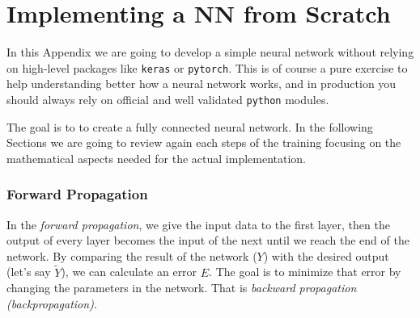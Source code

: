 \chapter{Implementing a NN from Scratch}
\label{sec:nn_from_scratch}

In this Appendix we are going to develop a simple neural network without relying on high-level packages like \texttt{keras} or \texttt{pytorch}.
This is of course a pure exercise to help understanding better how a neural network works, and in production you should always rely on official and well validated \texttt{python} modules.

%

The goal is to to create a fully connected neural network. In the following Sections we are going to review again each steps of the training focusing on the mathematical aspects needed for the actual implementation.

\subsection{Forward Propagation}
In the \emph{forward propagation}, we give the input data to the first layer, then the output of every layer becomes the input of the next until we reach the end of the network. By comparing the result of the network ($Y$) with the desired output (let’s say $\tilde{Y}$), we can calculate an error $E$. The goal is to minimize that error by changing the parameters in the network. That is \emph{backward propagation (backpropagation)}.

